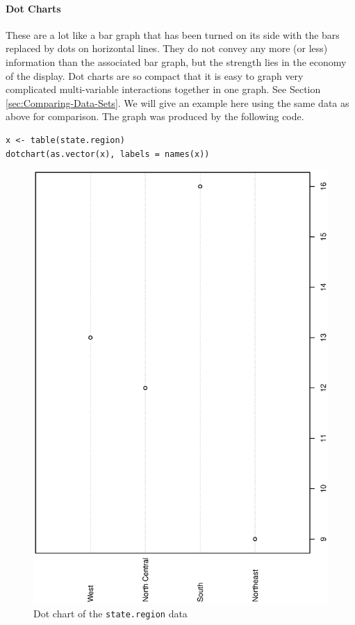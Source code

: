 \documentclass[captions=tableheading]{scrbook}
\begin{document}
\paragraph*{Dot Charts}
\label{par:Dotcharts}

These are a lot like a bar graph that has been turned on its side with the bars replaced by dots on horizontal lines. They do not convey any more (or less) information than the associated bar graph, but the strength lies in the economy of the display. Dot charts are so compact that it is easy to graph very complicated multi-variable interactions together in one graph. See Section \ref{sec:Comparing-Data-Sets}. We will give an example here using the same data as above for comparison. The graph was produced by the following code.

\begin{example}


\begin{verbatim}
x <- table(state.region)
dotchart(as.vector(x), labels = names(x))
\end{verbatim}



\begin{figure}[th]
    \includegraphics[angle=270, totalheight=4in]{img/dot-charts.ps}
    \caption{Dot chart of the \texttt{state.region} data}
    \label{fig:dot-charts}
  \end{figure}


\end{example}
\end{document}
